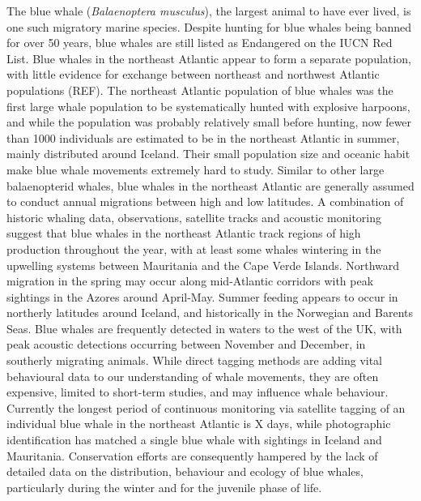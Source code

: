\documentclass[a4paper,12pt]{article}
\begin{document}
The blue whale (\textit{Balaenoptera musculus}), the largest animal to have ever lived, is one such migratory marine species. 
Despite hunting for blue whales being banned for over 50 years, blue whales are still listed as Endangered on the IUCN Red List\cite{reilly2008balaenoptera}.
Blue whales in the northeast Atlantic appear to form a separate population, with little evidence for exchange between northeast and northwest Atlantic populations (REF).  
The northeast Atlantic population of blue whales was the first large whale population to be systematically hunted with explosive harpoons, and while the population was probably relatively small before hunting, now fewer than 1000 individuals are estimated to be in the northeast Atlantic in summer, mainly distributed around Iceland\cite{pike2009note}.
Their small population size and oceanic habit make blue whale movements extremely hard to study. 
Similar to other large balaenopterid whales, blue whales in the northeast Atlantic are generally assumed to conduct annual migrations between high and low latitudes. 
A combination of historic whaling data, observations, satellite tracks and acoustic monitoring suggest that blue whales in the northeast Atlantic track regions of high production throughout the year, with at least some whales wintering in the upwelling systems between Mauritania and the Cape Verde Islands\cite{baines2014upwellings}.
Northward migration in the spring may occur along mid-Atlantic corridors with peak sightings in the Azores around April-May. Summer feeding appears to occur in northerly latitudes around Iceland, and historically in the Norwegian and Barents Seas\cite{pike2009note}.
Blue whales are frequently detected in waters to the west of the UK, with peak acoustic detections occurring between November and December, in southerly migrating animals\cite{reeves2004historical,baines2017autumn,charif2009acoustic,visser2011timing}.
While direct tagging methods are adding vital behavioural data to our understanding of whale movements\cite{borger15,mcdonald2006biogeographic,bailey2009behavioural,mate2007evolution,silva2013north}, they are often expensive, limited to short-term studies\cite{bailey2009behavioural,best2015tag,mate2007evolution}, and may influence whale behaviour\cite{walker2012review}.
Currently the longest period of continuous monitoring via satellite tagging of an individual blue whale in the northeast Atlantic is X days, while photographic identification has matched a single blue whale with sightings in Iceland and Mauritania.\cite{baines2014upwellings}  %
Conservation efforts are consequently hampered by the lack of detailed data on the distribution, behaviour and ecology of blue whales, particularly during the winter and for the juvenile phase of life. 
\end{document}
